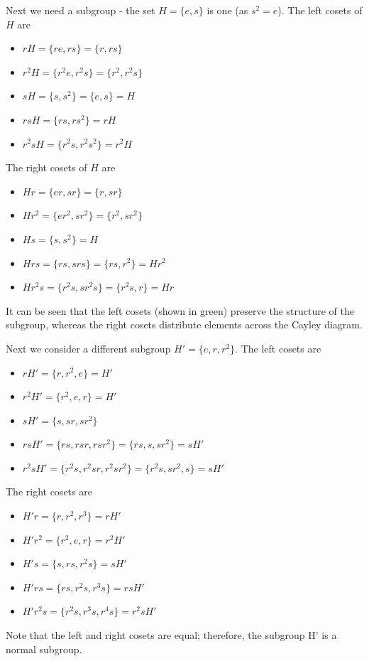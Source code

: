 Next we need a subgroup - the set \(H=\{e, s\}\) is one (as \(s^2=e\)).
The left cosets of \(H\) are

\begin{itemize}
\item
  \(rH = \{re, rs\} = \{r, rs\}\)
\item
  \(r^2H = \{r^2e, r^2s\} = \{r^2, r^2s\}\)
\item
  \(sH = \{s, s^2\} = \{e, s\} = H\)
\item
  \(rsH = \{rs, rs^2\} = rH\)
\item
  \(r^2sH = \{r^2s, r^2s^2\} = r^2H\)
\end{itemize}

The right cosets of \(H\) are

\begin{itemize}
\item
  \(Hr = \{er, sr\} = \{r, sr\}\)
\item
  \(Hr^2 = \{er^2, sr^2\} = \{r^2, sr^2\}\)
\item
  \(Hs = \{s, s^2\} = H\)
\item
  \(Hrs = \{rs, srs\} = \{rs, r^2\} = Hr^2\)
\item
  \(Hr^2s = \{r^2s, sr^2s\} = \{r^2s, r\} = Hr\)
\end{itemize}

It can be seen that the left cosets (shown in green) preserve the
structure of the subgroup, whereas the right cosets distribute elements
across the Cayley diagram.

Next we consider a different subgroup \(H' = \{e, r, r^2\}\). The left
cosets are

\begin{itemize}
\item
  \(rH' = \{r, r^2, e\} = H'\)
\item
  \(r^2H' = \{r^2, e, r\} = H'\)
\item
  \(sH' = \{s, sr, sr^2\}\)
\item
  \(rsH' = \{rs, rsr, rsr^2\} = \{rs, s, sr^2\} = sH'\)
\item
  \(r^2sH' = \{r^2s, r^2sr, r^2sr^2\} = \{r^2s, sr^2, s\} = sH'\)
\end{itemize}

The right cosets are

\begin{itemize}
\item
  \(H'r = \{r, r^2, r^3\} = rH'\)
\item
  \(H'r^2 = \{r^2, e, r\} = r^2H'\)
\item
  \(H's = \{s, rs, r^2s\} = sH'\)
\item
  \(H'rs = \{rs, r^2s, r^3s\} = rsH'\)
\item
  \(H'r^2s = \{r^2s, r^3s, r^4s\} = r^2sH'\)
\end{itemize}

Note that the left and right cosets are equal; therefore, the subgroup
H' is a normal subgroup.
